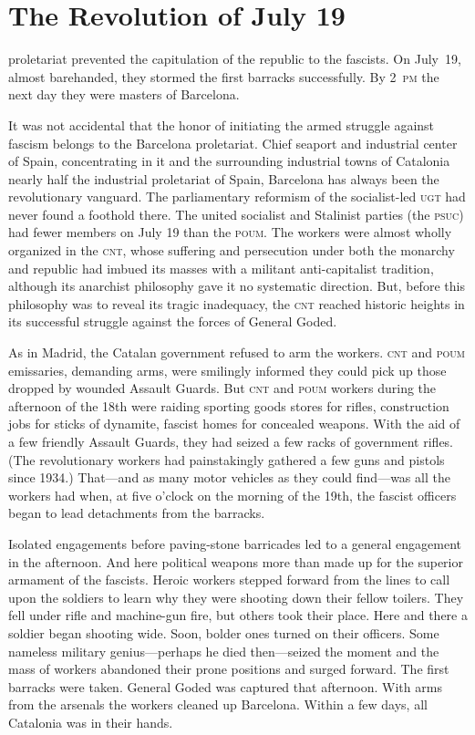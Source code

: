 \chapter{The Revolution of July 19}

 proletariat prevented the capitulation of the republic to the fascists. On July~19, almost barehanded, they stormed the first barracks successfully. By 2~\textsc{pm} the next day they were masters of Barcelona.

It was not accidental that the honor of initiating the armed struggle against fascism belongs to the Barcelona proletariat. Chief seaport and industrial center of Spain, concentrating in it and the surrounding industrial towns of Catalonia nearly half the industrial proletariat of Spain, Barcelona has always been the revolutionary vanguard. The parliamentary reformism of the socialist-led \textsc{ugt} had never found a foothold there. The united socialist and Stalinist parties (the \textsc{psuc}) had fewer members on July 19 than the \textsc{poum}. The workers were almost wholly organized in the \textsc{cnt}, whose suffering and persecution under both the monarchy and republic had imbued its masses with a militant anti-capitalist tradition, although its anarchist philosophy gave it no systematic direction. But, before this philosophy was to reveal its tragic inadequacy, the \textsc{cnt} reached historic heights in its successful struggle against the forces of General Goded.

As in Madrid, the Catalan government refused to arm the workers. \textsc{cnt} and \textsc{poum} emissaries, demanding arms, were smilingly informed they could pick up those dropped by wounded Assault Guards.
But \textsc{cnt} and \textsc{poum} workers during the afternoon of the 18th were raiding sporting goods stores for rifles, construction jobs for sticks of dynamite, fascist homes for concealed weapons. With the aid of a few friendly Assault Guards, they had seized a few racks of government rifles. (The revolutionary workers had painstakingly gathered a few guns and pistols since 1934.) That—and as many motor vehicles as they could find—was all the workers had when, at five o’clock on the morning of the 19th, the fascist officers began to lead detachments from the barracks.

Isolated engagements before paving-stone barricades led to a general engagement in the afternoon. And here political weapons more than made up for the superior armament of the fascists. Heroic workers stepped forward from the lines to call upon the soldiers to learn why they were shooting down their fellow toilers. They fell under rifle and machine-gun fire, but others took their place. Here and there a soldier began shooting wide. Soon, bolder ones turned on their officers. Some nameless military genius—perhaps he died then—seized the moment and the mass of workers abandoned their prone positions and surged forward. The first barracks were taken. General Goded was captured that afternoon. With arms from the arsenals the workers cleaned up Barcelona. Within a few days, all Catalonia was in their hands.

